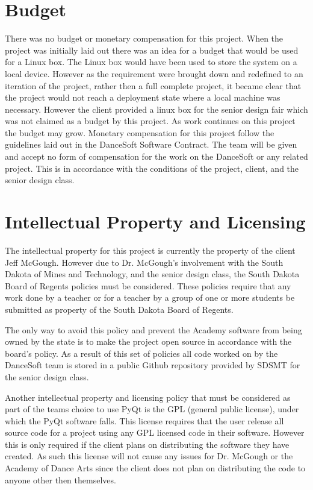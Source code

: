\section{Budget}
There was no budget or monetary compensation for this project. When the project was initially laid out there was an idea for a budget that would be used for a Linux box. The Linux box would have been used to store the system on a local device. However as the requirement were brought down and redefined to an iteration of the project, rather then a full complete project, it became clear that the project would not reach a deployment state where a local machine was necessary. However the client provided a linux box for the senior design fair which was not claimed as a budget by this project. As work continues on this project the budget may grow.  
Monetary compensation for this project follow the guidelines laid out in the DanceSoft Software Contract. The team will be given and accept no form of compensation for the work on the DanceSoft or any related project. This is in accordance with the conditions of the project, client, and the senior design class.

\section{Intellectual Property and Licensing}
The intellectual property for this project is currently the property of the client Jeff McGough. However due to Dr. McGough's involvement with the South Dakota of Mines and Technology, and the senior design class, the South Dakota Board of Regents policies must be considered. These policies require that any work done by a teacher or for a teacher by a group of one or more students be submitted as property of the South Dakota Board of Regents.

The only way to avoid this policy and prevent the Academy software from being owned by the state is to make the project open source in accordance with the board's policy. As a result of this set of policies all code worked on by the DanceSoft team is stored in a public Github repository provided by SDSMT for the senior design class.

Another intellectual property and licensing policy that must be considered as part of the teams choice to use PyQt is the GPL (general public license), under which the PyQt software falls. This license requires that the user release all source code for a project using any GPL licensed code in their software. However this is only required if the client plans on distributing the software they have created. As such this license will not cause any issues for Dr. McGough or the Academy of Dance Arts since the client does not plan on distributing the code to anyone other then themselves. 

